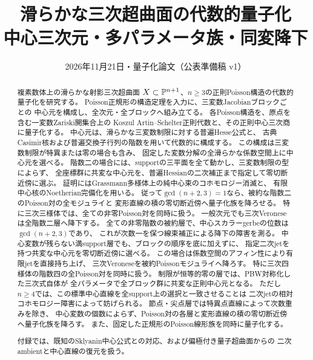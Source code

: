 
\title{滑らかな三次超曲面の代数的量子化\\
\large 中心三次元・多パラメータ族・同変降下}
\author{}
\date{2026年11月21日・量子化論文（公表準備稿 v1）}

\maketitle
\begin{abstract}
複素数体上の滑らかな射影三次超曲面
$X\subset\mathbb P^{n+1}$、$n\ge3$の正則Poisson構造の代数的量子化を研究する。
Poisson正規形の構造定理を入力に、三変数Jacobianブロックごとの
中心元を構成し、全次元・全ブロックへ組み立てる。
各Poisson構造を、原点を含む一変数Zariski開集合上の
Koszul Artin--Schelter正則代数と、その正則中心三次商に量子化する。
中心元は、滑らかな三変数制限に対する普遍Hesse公式と、
古典Casimir核および普遍交換子行列の階数を用いて代数的に構成する。
この構成は三変数制限が特異または零の場合も含み、
固定した変数分解の全滑らかな係数空間上に中心元を選べる。
階数二の場合には、supportの三平面を全て動かし、三変数制限の型によらず、
全座標群に共変な中心元を、普遍Hessianの二次補正まで指定して零切断近傍に選ぶ。
証明にはGrassmann多様体上の純中心束のコホモロジー消滅と、
有限中心核のNoetherian完備化を用いる。
従って$\gcd(n+2,3)=1$なら、被約な階数二のPoisson対の全モジュライと
変形直線の積の零切断近傍へ量子化族を降ろせる。
特に三次三様体では、全ての非零Poisson対を同時に扱う。
一般次元でも三次Veroneseは全階数二層へ降下する。
全ての非零階数の被約層で、中心スカラーgerbeの位数は$\gcd(n+2,3)$であり、
これが次数一を保つ線束補正による降下の障害を測る。
中心変数が残らない満support層でも、ブロックの順序を底に加えずに、
指定二次jetを持つ共変な中心元を零切断近傍に選べる。
この場合は係数空間のアフィン性により有限jetを直接持ち上げ、
三次Veroneseを被約Poissonモジュライへ降ろす。
特に三次四様体の階数四の全Poisson対を同時に扱う。
制限が恒等的零の層では、PBW対称化した三次式自体が
全パラメータで全ブロック群に共変な正則中心元となる。
ただし$n\ge4$では、この標準中心直線を全support上の選択と一致させることは
二次jetの相対コホモロジー障害によって妨げられる。
節点・尖点層では特異点直線によって次数重みを除き、
中心変数の個数によらず、Poisson対の各層と変形直線の積の零切断近傍へ量子化族を降ろす。
また、固定した正規形のPoisson線形族を同時に量子化する。

付録では、既知のSklyanin中心公式との対応、および偏極付き量子超曲面からの
二次ambientと中心直線の復元を扱う。
\end{abstract}
\tableofcontents

